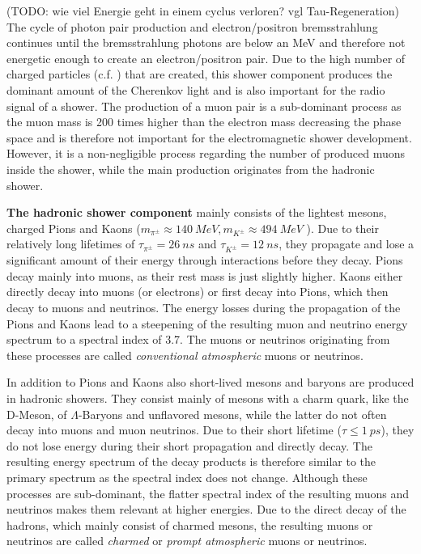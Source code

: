 (TODO: wie viel Energie geht in einem cyclus verloren? vgl Tau-Regeneration)
The cycle of photon pair production and electron/positron bremsstrahlung continues until the bremsstrahlung photons are below an MeV and therefore not energetic enough to create an electron/positron pair.
Due to the high number of charged particles (c.f. ) that are created, this shower component produces the dominant amount of the Cherenkov light and is also important for the radio signal of a shower.
The production of a muon pair is a sub-dominant process as the muon mass is 200 times higher than the electron mass decreasing the phase space and is therefore not important for the electromagnetic shower development.
However, it is a non-negligible process regarding the number of produced muons inside the shower, while the main production originates from the hadronic shower.

\textbf{The hadronic shower component} mainly consists of the lightest mesons, charged Pions and Kaons ($m_{\pi^{\pm}} \approx \SI{140}{MeV}, m_{K^{\pm}} \approx \SI{494}{MeV}$ \cite{PDG20}).
Due to their relatively long lifetimes of $\tau_{\pi^{\pm}} = \SI{26}{ns}$ and $\tau_{K^{\pm}} = \SI{12}{ns}$, they propagate and lose a significant amount of their energy through interactions before they decay.
Pions decay mainly into muons, as their rest mass is just slightly higher.
Kaons either directly decay into muons (or electrons) or first decay into Pions, which then decay to muons and neutrinos.
The energy losses during the propagation of the Pions and Kaons lead to a steepening of the resulting muon and neutrino energy spectrum to a spectral index of \num{3.7}.
The muons or neutrinos originating from these processes are called \textit{conventional atmospheric} muons or neutrinos.

In addition to Pions and Kaons also short-lived mesons and baryons are produced in hadronic showers.
They consist mainly of mesons with a charm quark, like the D-Meson, of $\Lambda$-Baryons and unflavored mesons, while the latter do not often decay into muons and muon neutrinos.
Due to their short lifetime ($\tau \leq \SI{1}{ps}$), they do not lose energy during their short propagation and directly decay.
The resulting energy spectrum of the decay products is therefore similar to the primary spectrum as the spectral index does not change.
Although these processes are sub-dominant, the flatter spectral index of the resulting muons and neutrinos makes them relevant at higher energies.
Due to the direct decay of the hadrons, which mainly consist of charmed mesons, the resulting muons or neutrinos are called \textit{charmed} or \textit{prompt atmospheric} muons or neutrinos.

